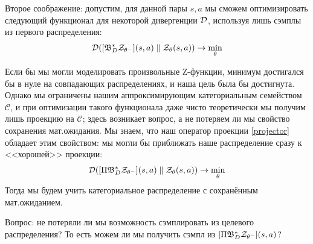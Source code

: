 Второе соображение: допустим, для данной пары $s, a$ мы сможем оптимизировать следующий функционал для некоторой дивергенции $\mathcal{D}$, используя лишь сэмплы из первого распределения:
\begin{equation*}
\mathcal{D} ([\mathfrak{B}^*_D \mathcal{Z}_{\theta^-} ] (s, a) \parallel \mathcal{Z}_{\theta}(s, a)) \to \min_{\theta}
\end{equation*}

Если бы мы могли моделировать произвольные Z-функции, минимум достигался бы в нуле на совпадающих распределениях, и наша цель была бы достигнута. Однако мы ограничены нашим аппроксимирующим категориальным семейством $\mathcal{C}$, и при оптимизации такого функционала даже чисто теоретически мы получим лишь проекцию на $\mathcal{C}$; здесь возникает вопрос, а не потеряем ли мы свойство сохранения мат.ожидания. Мы знаем, что наш оператор проекции \eqref{projector} обладает этим свойством: мы могли бы приближать наше распределение сразу к <<хорошей>> проекции:
\begin{equation}\label{distributionalopt}
\mathcal{D} ([\Pi \mathfrak{B}^*_D \mathcal{Z}_{\theta^-}](s, a) \parallel \mathcal{Z}_{\theta}(s, a)) \to \min_{\theta}
\end{equation}
Тогда мы будем учить категориальное распределение с сохранённым мат.ожиданием. 

Вопрос: не потеряли ли мы возможность сэмплировать из целевого распределения? То есть можем ли мы получить сэмпл из $[\Pi \mathfrak{B}^*_D \mathcal{Z}_{\theta^-}](s, a)$?

